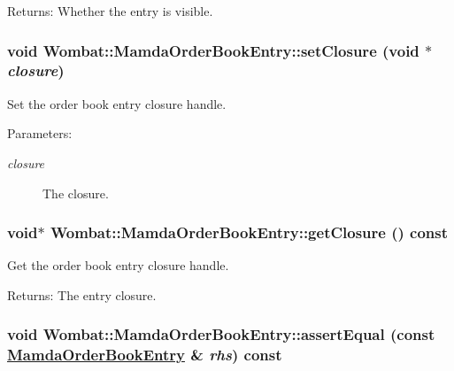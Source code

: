 \begin{Desc}
\item[Returns:]Whether the entry is visible. \end{Desc}
\hypertarget{classWombat_1_1MamdaOrderBookEntry_649b46a82d497681198796ebf61dea3b}{
\subsubsection[setClosure]{\setlength{\rightskip}{0pt plus 5cm}void Wombat::Mamda\-Order\-Book\-Entry::set\-Closure (void $\ast$ {\em closure})}}
\label{classWombat_1_1MamdaOrderBookEntry_649b46a82d497681198796ebf61dea3b}


Set the order book entry closure handle. 

\begin{Desc}
\item[Parameters:]
\begin{description}
\item[{\em closure}]The closure. \end{description}
\end{Desc}
\hypertarget{classWombat_1_1MamdaOrderBookEntry_d9674c47219a35f72beef4c5b893071d}{
\subsubsection[getClosure]{\setlength{\rightskip}{0pt plus 5cm}void$\ast$ Wombat::Mamda\-Order\-Book\-Entry::get\-Closure () const}}
\label{classWombat_1_1MamdaOrderBookEntry_d9674c47219a35f72beef4c5b893071d}


Get the order book entry closure handle. 

\begin{Desc}
\item[Returns:]The entry closure. \end{Desc}
\hypertarget{classWombat_1_1MamdaOrderBookEntry_17d40e2ec3b848f5fed1b81c92e7b329}{
\subsubsection[assertEqual]{\setlength{\rightskip}{0pt plus 5cm}void Wombat::Mamda\-Order\-Book\-Entry::assert\-Equal (const \hyperlink{classWombat_1_1MamdaOrderBookEntry}{Mamda\-Order\-Book\-Entry} \& {\em rhs}) const}}
\label{classWombat_1_1MamdaOrderBookEntry_17d40e2ec3b848f5fed1b81c92e7b329}


